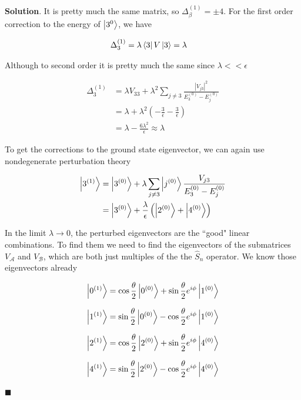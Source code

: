 \documentclass[12pt]{article}
\theoremstyle{definition}
\newenvironment{s}{%
        \begin{trivlist} \item \textbf{Solution}. }{%
            \hspace*{\fill} $\blacksquare$\end{trivlist}}%
\begin{document}
{\begin{s}
It is pretty much the same matrix, so $\Delta_{\beta}^{(1)} = \pm 4$. For the first order correction to the energy of $\ket{3^{0}}$, we have

\begin{align*}
\Delta_{3}^{(1)} &= \lambda\bra{3}V\ket{3} = \lambda
\end{align*}

Although to second order it is pretty much the same since $\lambda << \epsilon$

\begin{align*}
\Delta_{3}^{(1)} &= \lambda V_{33} + \lambda^{2}\sum_{j\neq 3}\frac{|V_{j3}|^{2}}{E_{3}^{(0)}-E_{j}^{(0)}}\\
&= \lambda + \lambda^{2}\left(-\frac{3}{\epsilon}-\frac{3}{\epsilon}\right)\\
&= \lambda - \frac{6\lambda^{2}}{\epsilon} \approx \lambda
\end{align*}

To get the corrections to the ground state eigenvector, we can again use nondegenerate perturbation theory 

\begin{align*}
\ket{3^{(1)}} &= \ket{3^{(0)}} + \lambda\sum_{j\neq 3}\ket{j^{(0)}}\frac{V_{j3}}{E_{3}^{(0)}-E_{j}^{(0)}}\\
&= \ket{3^{(0)}} + \frac{\lambda}{\epsilon}\left(\ket{2^{(0)}}+\ket{4^{(0)}}\right)
\end{align*}

In the limit $\lambda \rightarrow 0$, the perturbed eigenvectors are the ``good" linear combinations. To find them we need to find the eigenvectors of the submatrices $V_{\mathcal{A}}$ and $V_{\mathcal{B}}$, which are both just multiples of the the $\hat{S}_n$ operator. We know those eigenvectors already

\begin{align*}
\ket{0^{(1)}} = \cos\frac{\theta}{2}\ket{0^{(0)}} + \sin\frac{\theta}{2}e^{i\phi}\ket{1^{(0)}}
\end{align*}

\begin{align*}
\ket{1^{(1)}} = \sin\frac{\theta}{2}\ket{0^{(0)}} - \cos\frac{\theta}{2}e^{i\phi}\ket{1^{(0)}}
\end{align*}

\begin{align*}
\ket{2^{(1)}} = \cos\frac{\theta}{2}\ket{2^{(0)}} + \sin\frac{\theta}{2}e^{i\phi}\ket{4^{(0)}}
\end{align*}

\begin{align*}
\ket{4^{(1)}} = \sin\frac{\theta}{2}\ket{2^{(0)}} - \cos\frac{\theta}{2}e^{i\phi}\ket{4^{(0)}}
\end{align*}


\end{s}}
\end{document}
